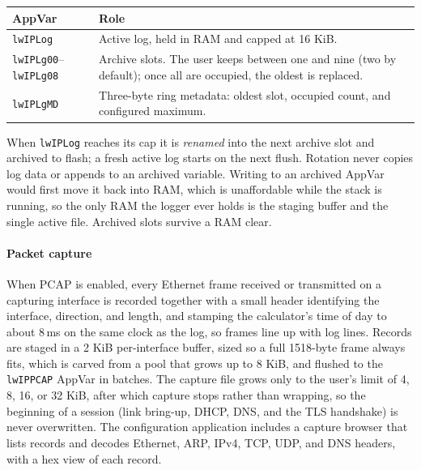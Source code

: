 \documentclass[titlepage]{report}
\begin{document}
		\begin{center}
			\footnotesize
			\begin{tabularx}{\textwidth}{@{}>{\raggedright\arraybackslash}p{}X@{}}
				\toprule
				\rowcolor{gray!18}
				\textbf{AppVar} & \textbf{Role} \\
				\midrule
				\texttt{lwIPLog} & Active log, held in RAM and capped at 16 KiB. \\
				\texttt{lwIPLg00}--\texttt{lwIPLg08} & Archive slots. The user keeps between one and nine (two by default); once all are occupied, the oldest is replaced. \\
				\texttt{lwIPLgMD} & Three-byte ring metadata: oldest slot, occupied count, and configured maximum. \\
				\bottomrule
			\end{tabularx}
		\end{center}

		When \texttt{lwIPLog} reaches its cap it is \emph{renamed} into the next archive slot and archived to flash; a fresh active log starts on the next flush. Rotation never copies log data or appends to an archived variable. Writing to an archived AppVar would first move it back into RAM, which is unaffordable while the stack is running, so the only RAM the logger ever holds is the staging buffer and the single active file. Archived slots survive a RAM clear.

		\paragraph{Packet capture}
		When PCAP is enabled, every Ethernet frame received or transmitted on a capturing interface is recorded together with a small header identifying the interface, direction, and length, and stamping the calculator's time of day to about 8\,ms on the same clock as the log, so frames line up with log lines. Records are staged in a 2 KiB per-interface buffer, sized so a full 1518-byte frame always fits, which is carved from a pool that grows up to 8 KiB, and flushed to the \texttt{lwIPPCAP} AppVar in batches. The capture file grows only to the user's limit of 4, 8, 16, or 32 KiB, after which capture stops rather than wrapping, so the beginning of a session (link bring-up, DHCP, DNS, and the TLS handshake) is never overwritten. The configuration application includes a capture browser that lists records and decodes Ethernet, ARP, IPv4, TCP, UDP, and DNS headers, with a hex view of each record.
\end{document}
